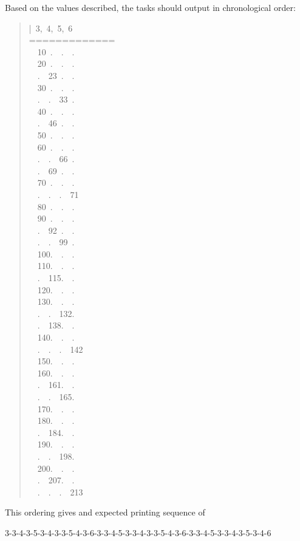 \documentclass[letterpaper]{article}
\begin{document}
Based on the values described, the tasks should output in chronological order:
%
\begin{quote}{\ttfamily \raggedright \noindent
|~3,~4,~5,~6\\
=============\\
~~10~.~~.~~.\\
~~20~.~~.~~.\\
~~.~~23~.~~.\\
~~30~.~~.~~.\\
~~.~~.~~33~.\\
~~40~.~~.~~.\\
~~.~~46~.~~.\\
~~50~.~~.~~.\\
~~60~.~~.~~.\\
~~.~~.~~66~.\\
~~.~~69~.~~.\\
~~70~.~~.~~.\\
~~.~~.~~.~~71\\
~~80~.~~.~~.\\
~~90~.~~.~~.\\
~~.~~92~.~~.\\
~~.~~.~~99~.\\
~~100.~~.~~.\\
~~110.~~.~~.\\
~~.~~115.~~.\\
~~120.~~.~~.\\
~~130.~~.~~.\\
~~.~~.~~132.\\
~~.~~138.~~.\\
~~140.~~.~~.\\
~~.~~.~~.~~142\\
~~150.~~.~~.\\
~~160.~~.~~.\\
~~.~~161.~~.\\
~~.~~.~~165.\\
~~170.~~.~~.\\
~~180.~~.~~.\\
~~.~~184.~~.\\
~~190.~~.~~.\\
~~.~~.~~198.\\
~~200.~~.~~.\\
~~.~~207.~~.\\
~~.~~.~~.~~213
}
\end{quote}

This ordering gives and expected printing sequence of

3-3-4-3-5-3-4-3-3-5-4-3-6-3-3-4-5-3-3-4-3-3-5-4-3-6-3-3-4-5-3-3-4-3-5-3-4-6
\end{document}
